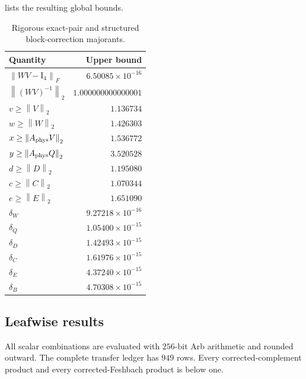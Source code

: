 \documentclass[11pt]{article}
\theoremstyle{definition}
\theoremstyle{remark}
\newcommand{\Id}{\mathrm I}
\newcommand{\norm}[1]{\left\lVert#1\right\rVert}
\newcommand{\Aphys}{A_{\rm phys}}
\begin{document}
 lists the resulting global bounds.

\begin{table}[H]
\centering
\caption{Rigorous exact-pair and structured block-correction majorants.}
\label{tab:majorants}
\begin{tabular}{@{}lr@{}}
\toprule
Quantity & Upper bound\\
\midrule
\(\norm{WV-\Id_4}_F\) & \(6.50085\times10^{-16}\)\\
\(\norm{(WV)^{-1}}_2\) & \(1.000000000000001\)\\
\(v\geq\norm V_2\) & \(1.136734\)\\
\(w\geq\norm W_2\) & \(1.426303\)\\
\(x\geq\norm{\Aphys V}_2\) & \(1.536772\)\\
\(y\geq\norm{\Aphys Q}_2\) & \(3.520528\)\\
\(d\geq\norm D_2\) & \(1.195080\)\\
\(c\geq\norm C_2\) & \(1.070344\)\\
\(e\geq\norm E_2\) & \(1.651090\)\\
\(\delta_W\) & \(9.27218\times10^{-16}\)\\
\(\delta_Q\) & \(1.05400\times10^{-15}\)\\
\(\delta_D\) & \(1.42493\times10^{-15}\)\\
\(\delta_C\) & \(1.61976\times10^{-15}\)\\
\(\delta_E\) & \(4.37240\times10^{-15}\)\\
\(\delta_B\) & \(4.70308\times10^{-15}\)\\
\bottomrule
\end{tabular}
\end{table}

\subsection{Leafwise results}

All scalar combinations are evaluated with \(256\)-bit Arb arithmetic and
rounded outward.  The complete transfer ledger has \(949\) rows.  Every
corrected-complement product and every corrected-Feshbach product is below
one.
\end{document}
